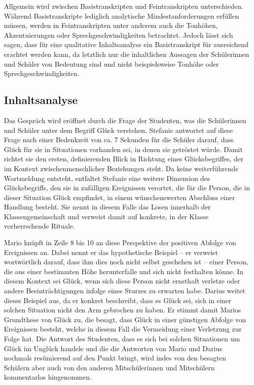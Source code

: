 Allgemein wird zwischen Basistranskripten und Feintranskripten unterschieden. 
Während Basistranskripte lediglich analytische Mindestanforderungen erfüllen müssen, werden in Feintranskripten unter anderem auch die Tonhöhen, Akzentuierungen oder Sprechgeschwindigkeiten betrachtet.
Jedoch lässt sich sagen, dass für eine qualitative Inhaltsanalyse ein Basistranskript für ausreichend erachtet werden kann, da letztlich nur die inhaltlichen Aussagen der Schülerinnen und Schüler von Bedeutung sind und nicht beispielsweise Tonhöhe oder Sprechgeschwindigkeiten.


\newpage


\subsection{Inhaltsanalyse}

Das Gespräch wird eröffnet durch die Frage der Studenten, was die Schülerinnen und Schüler unter dem Begriff Glück verstehen. 
Stefanie antwortet auf diese Frage nach einer Bedenkzeit von ca. 7 Sekunden für die Schüler darauf, dass Glück für sie in Situationen vorhanden sei, in denen sie getröstet würde. 
Damit richtet sie den ersten, definierenden Blick in Richtung eines Glücksbegriffes, der im Kontext zwischenmenschlicher Beziehungen steht. 
Da keine weiterführende Wortmeldung entsteht, entfaltet Stefanie eine weitere Dimension des Glücksbegriffs, den sie in zufälligen Ereignissen verortet, die für die Person, die in dieser Situation Glück empfindet, in einem wünschenswerten Abschluss einer Handlung besteht. 
Sie nennt in diesem Falle das Losen innerhalb der Klassengemeinschaft und verweist damit auf konkrete, in der Klasse vorherrschende Rituale. 

Mario knüpft in Zeile 8 bis 10 an diese Perspektive der positiven Abfolge von Ereignissen an. 
Dabei nennt er das hypothetische Beispiel -- er verweist wortwörtlich darauf, dass ihm dies noch nicht selbst geschehen ist -- einer Person, die aus einer bestimmten Höhe herunterfalle und sich nicht festhalten könne. 
In diesem Kontext sei Glück, wenn sich diese Person nicht ernsthaft verletze oder andere Beeinträchtigungen infolge eines Sturzes zu erwarten habe. 
Darius weitet dieses Beispiel aus, da er konkret beschreibt, dass es Glück sei, sich in einer solchen Situation nicht den Arm gebrochen zu haben.
Er stimmt damit Marios Grundthese von Glück zu, die besagt, dass Glück in einer günstigen Abfolge von Ereignissen besteht, welche in diesem Fall die Vermeidung einer Verletzung zur Folge hat. 
Die Antwort des Studenten, dass es sich bei solchen Situationen um Glück im Unglück handele und die die Antworten von Mario und Darius nochmals resümierend auf den Punkt bringt, wird indes von den besagten Schülern aber auch von den anderen Mitschülerinnen und Mitschülern kommentarlos hingenommen.

